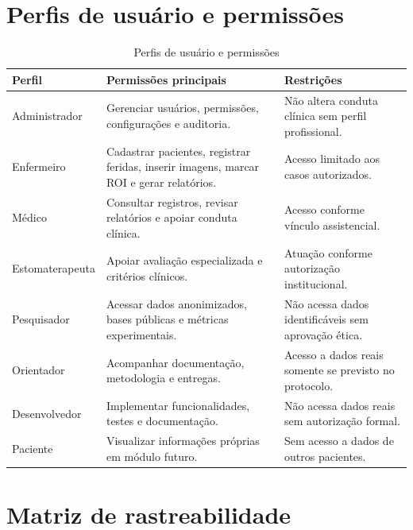 \documentclass[
    12pt,
    oneside,
    a4paper,
    chapter=TITLE,
    brazil,
    sumario=tradicional,
    hidelinks
]{abntex2}
\begin{document}
\chapter{Perfis de usuário e permissões}

\begin{table}[htbp]
    \centering
    \caption{\label{tab:perfis}Perfis de usuário e permissões}
    \begin{tabular}{L{3.0cm}L{5.2cm}L{5.2cm}}
        \toprule
        \textbf{Perfil} & \textbf{Permissões principais} & \textbf{Restrições} \\
        \midrule
        Administrador & Gerenciar usuários, permissões, configurações e auditoria. & Não altera conduta clínica sem perfil profissional. \\
        Enfermeiro & Cadastrar pacientes, registrar feridas, inserir imagens, marcar ROI e gerar relatórios. & Acesso limitado aos casos autorizados. \\
        Médico & Consultar registros, revisar relatórios e apoiar conduta clínica. & Acesso conforme vínculo assistencial. \\
        Estomaterapeuta & Apoiar avaliação especializada e critérios clínicos. & Atuação conforme autorização institucional. \\
        Pesquisador & Acessar dados anonimizados, bases públicas e métricas experimentais. & Não acessa dados identificáveis sem aprovação ética. \\
        Orientador & Acompanhar documentação, metodologia e entregas. & Acesso a dados reais somente se previsto no protocolo. \\
        Desenvolvedor & Implementar funcionalidades, testes e documentação. & Não acessa dados reais sem autorização formal. \\
        Paciente & Visualizar informações próprias em módulo futuro. & Sem acesso a dados de outros pacientes. \\
        \bottomrule
    \end{tabular}
\end{table}

\chapter{Matriz de rastreabilidade}
\end{document}
